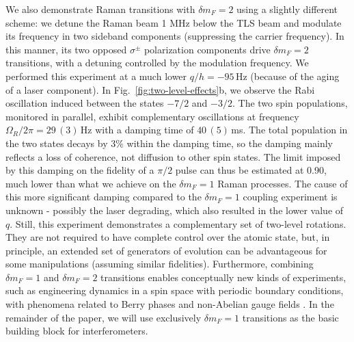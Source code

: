 We also demonstrate Raman transitions with $\delta m_F = 2$ using a slightly different scheme: we detune the Raman beam 1 MHz below the TLS beam and modulate its frequency in two sideband components (suppressing the carrier frequency). In this manner, its two opposed $\sigma^\pm$ polarization components drive $\delta m_F = 2$ transitions, with a detuning controlled by the modulation frequency. We performed this experiment at a much lower $q/h = -95\,$Hz (because of the aging of a laser component). In Fig.~\ref{fig:two-level-effects}b, we observe the Rabi oscillation induced between the states $-7/2$ and $-3/2$. The two spin populations, monitored in parallel, exhibit complementary oscillations at frequency {$\Omega_R/ 2 \pi = 29\,(3)\,$Hz} with a damping time of {$40\,(5)$\,ms}. The total population in the two states decays by 3$\%$ within the damping time, so the damping mainly reflects a loss of coherence, not diffusion to other spin states. The limit imposed by this damping on the fidelity of a $\pi/2$ pulse can thus be estimated at 0.90, much lower than what we achieve on the $\delta m_F = 1$ Raman processes. The cause of this more significant damping compared to the $\delta m_F = 1$ coupling experiment is unknown - possibly the laser degrading, which also resulted in the lower value of $q$.
Still, this experiment demonstrates a complementary set of two-level rotations. They are not required to have complete control over the atomic state, but, in principle, an extended set of generators of evolution can be advantageous for some manipulations (assuming similar fidelities). Furthermore, combining $\delta m_F = 1$ and $\delta m_F = 2$ transitions enables conceptually new kinds of experiments, such as engineering dynamics in a spin space with periodic boundary conditions, with phenomena related to Berry phases and non-Abelian gauge fields \cite{Ruseckas2005, Leroux2018naa}. In the remainder of the paper, we will use exclusively $\delta m_F = 1$ transitions as the basic building block for interferometers. 

